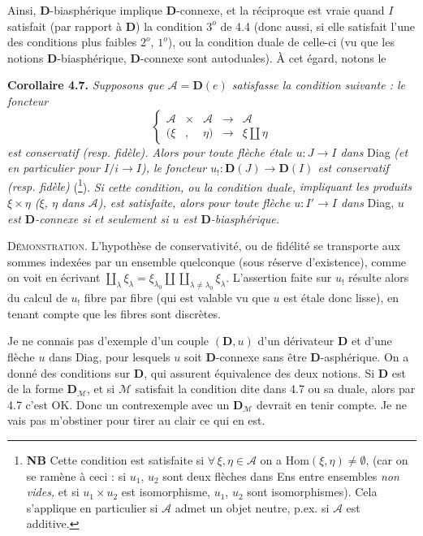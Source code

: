 \documentclass[11pt]{article}
\newcommand{\printedpage}[1]{\marginpar{\footnotesize p.~#1}}
\newcommand{\msp}[1]{\marginpar{\footnotesize [#1]}}
\newcommand{\D}{\mathbf{D}}
\begin{document}
Ainsi, $\D$-biasphérique implique $\D$-connexe, et la réciproque est vraie quand $I$ satisfait (par rapport à $\D$) la condition $3^o$ de 4.4 (donc aussi, si elle satisfait l'une des conditions plus faibles $2^o$, $1^o$), ou la condition duale de celle-ci (vu que les notions $\D$-biasphérique, $\D$-connexe sont autoduales). À cet égard, notons le

\textbf{Corollaire 4.7.} \textit{Supposons que $\mathcal{A} = \D(e)$ satisfasse la condition suivante : le foncteur}
\[
\left\{
\begin{array}{lcccl}
\mathcal{A} & \times & \mathcal{A} & \longrightarrow & \mathcal{A} \\[1ex]
(\xi & , & \eta) & \longrightarrow & \xi \amalg \eta
\end{array}
\right.
\]
\textit{est conservatif (resp. fidèle). Alors pour toute flèche étale $u : J \longrightarrow I$ dans} Diag \textit{(et en particulier pour $I/i \longrightarrow I$), le foncteur $u_! : \D(J) \longrightarrow \D(I)$ est conservatif (resp. fidèle)} (\footnote{\textbf{NB} Cette condition est satisfaite si $\forall\, \xi, \eta \in \mathcal{A}$ on a $\mathrm{Hom}(\xi,\eta) \neq \emptyset$, (car on se ramène à ceci : si $u_1$,
$u_2$ sont deux flèches dans Ens entre ensembles \textit{non vides,} et si $u_1 \times u_2$ est isomorphisme, $u_1$, $u_2$ sont isomorphismes). Cela s'applique en particulier si $\mathcal{A}$ admet un objet neutre, p.ex. si $\mathcal{A}$ est additive.}). \textit{Si cette condition, ou la condition duale,}
\printedpage{40}
\msp{page 64bis}
\textit{impliquant les produits $\xi\times\eta$ ($\xi$, $\eta$ dans $\mathcal{A}$), est satisfaite, alors pour toute flèche $u : I' \longrightarrow I$ dans} Diag, \textit{$u$ est $\D$-connexe si et seulement si $u$ est $\D$-biasphérique.}

\textsc{Démonstration.} L'hypothèse de conservativité, ou de fidélité se transporte aux sommes indexées par un ensemble quelconque (sous réserve d'existence), comme on voit en écrivant $\coprod\limits_{\lambda} \xi_\lambda = \xi_{\lambda_0} \amalg \coprod\limits_{\lambda\neq\lambda_0} \xi_\lambda$. L'assertion faite sur $u_!$ résulte alors du calcul de $u_!$ fibre par fibre (qui est valable vu que $u$ est étale donc lisse), en tenant compte que les fibres sont discrètes.

Je ne connais pas d'exemple d'un couple $(\D, u)$ d'un dérivateur $\D$ et d'une flèche $u$ dans Diag, pour lesquels $u$ soit $\D$-connexe sans être $\D$-asphérique. On a donné des conditions sur $\D$, qui assurent équivalence des deux notions. Si $\D$ est de la forme $\D_{\mathcal{M}}$, et si $\mathcal{M}$ satisfait la condition dite dans 4.7 ou sa duale, alors par 4.7 c'est OK. Donc un contrexemple avec un $\D_{\mathcal{M}}$ devrait en tenir compte. Je ne vais pas m'obstiner pour tirer au clair ce qui en est.
\end{document}
